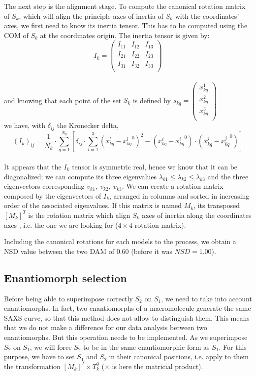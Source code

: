 \documentclass[a4paper, 11pt]{report}
\begin{document}
The next step is the alignment stage. 
To compute the canonical rotation matrix of $S_{k}$, which will align 
the principle axes of inertia of $S_{k}$ with the coordinates' axes, 
we first need to know its inertia tensor. 
This has to be computed using the COM of $S_{k}$ at the coordinates 
origin. 
The inertia tensor is given by:
\[
I_{k}=
\begin{pmatrix}
 I_{11} & I_{12} & I_{13} \\
 I_{21} & I_{22} & I_{23} \\
 I_{31} & I_{32} & I_{33} \\
\end{pmatrix}
\]\\
and knowing that each point of the set $S_{k}$ is defined by
$
s_{kq}=
\begin{pmatrix}
 x_{kq}^1 \\
 x_{kq}^2 \\
 x_{kq}^3 \\
\end{pmatrix}
$\\
we have, with $\delta_{ij}$ the Kronecker delta,
\[
(I_{k})_{ij} = \frac{1}{N_{k}} \cdot \sum\limits_{q=1}^{N_{k}} 
[\delta_{ij} \cdot \sum\limits_{l=1}^3 
 (x_{kq}^l - {x_{kq}^l}^0)^2 -  (x_{kq}^i - {x_{kq}^i}^0) 
 \cdot (x_{kq}^j - {x_{kq}^j}^0)]
\]\\
It appears that the $I_{k}$ tensor is symmetric real, hence we know 
that it can be diagonalized; we can compute its three eigenvalues 
$\lambda_{k1} \leq \lambda_{k2} \leq \lambda_{k3}$ and the three 
eigenvectors corresponding $v_{k1},\ v_{k2},\ v_{k3}$. 
We can create a rotation matrix composed by the eigenvectors of 
$I_{k}$, arranged in columns and sorted in increasing order of the 
associated eigenvalues. 
If this matrix is named $M_{k}$, its transposed $[M_{k}]^T$ is the 
rotation matrix which align $S_{k}$ axes of inertia along the 
coordinates axes \cite{supcomb}, i.e. the one we are looking for 
($4 \times 4$ rotation matrix).

Including the canonical rotations for each models to the process, we 
obtain a NSD value between the two DAM of $0.60$ (before it was 
$NSD = 1.00$).

\subsection{Enantiomorph selection}

Before being able to superimpose correctly $S_{2}$ on $S_{1}$, we need 
to take into account enantiomorphs. 
In fact, two enantiomorphs of a macromolecule generate the same SAXS 
curve, so that this method does not allow to distinguish them. 
This means that we do not make a difference for our data analysis 
between two enantiomorphs.
But this operation needs to be implemented. 
As we superimpose $S_{2}$ on $S_{1}$, we will force $S_{2}$ to be in 
the same enantiomorphic form as $S_{1}$. 
For this purpose, we have to set $S_{1}$ and $S_{2}$ in their canonical 
positions, i.e. apply to them the transformation 
$[M_{k}]^T \times T_{k}^0$ ($\times$ is here the matricial product).
\end{document}
